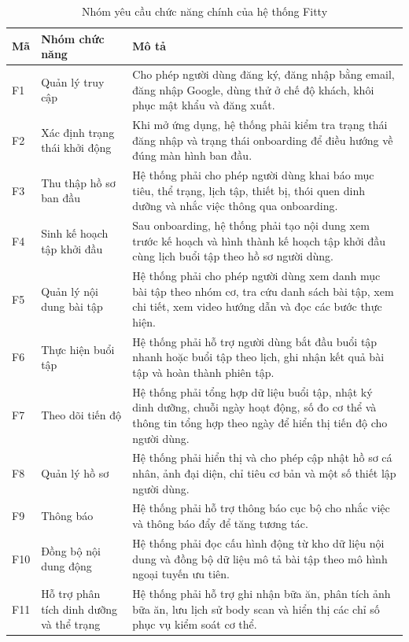 \begin{table}[H]
\centering
\caption{Nhóm yêu cầu chức năng chính của hệ thống Fitty}
\begin{tabular}{|p{1.5cm}|p{4.3cm}|p{7.2cm}|}
\hline
\textbf{Mã} & \textbf{Nhóm chức năng} & \textbf{Mô tả} \\ \hline
F1 & Quản lý truy cập & Cho phép người dùng đăng ký, đăng nhập bằng email, đăng nhập Google, dùng thử ở chế độ khách, khôi phục mật khẩu và đăng xuất. \\ \hline
F2 & Xác định trạng thái khởi động & Khi mở ứng dụng, hệ thống phải kiểm tra trạng thái đăng nhập và trạng thái onboarding để điều hướng về đúng màn hình ban đầu. \\ \hline
F3 & Thu thập hồ sơ ban đầu & Hệ thống phải cho phép người dùng khai báo mục tiêu, thể trạng, lịch tập, thiết bị, thói quen dinh dưỡng và nhắc việc thông qua onboarding. \\ \hline
F4 & Sinh kế hoạch tập khởi đầu & Sau onboarding, hệ thống phải tạo nội dung xem trước kế hoạch và hình thành kế hoạch tập khởi đầu cùng lịch buổi tập theo hồ sơ người dùng. \\ \hline
F5 & Quản lý nội dung bài tập & Hệ thống phải cho phép người dùng xem danh mục bài tập theo nhóm cơ, tra cứu danh sách bài tập, xem chi tiết, xem video hướng dẫn và đọc các bước thực hiện. \\ \hline
F6 & Thực hiện buổi tập & Hệ thống phải hỗ trợ người dùng bắt đầu buổi tập nhanh hoặc buổi tập theo lịch, ghi nhận kết quả bài tập và hoàn thành phiên tập. \\ \hline
F7 & Theo dõi tiến độ & Hệ thống phải tổng hợp dữ liệu buổi tập, nhật ký dinh dưỡng, chuỗi ngày hoạt động, số đo cơ thể và thông tin tổng hợp theo ngày để hiển thị tiến độ cho người dùng. \\ \hline
F8 & Quản lý hồ sơ & Hệ thống phải hiển thị và cho phép cập nhật hồ sơ cá nhân, ảnh đại diện, chỉ tiêu cơ bản và một số thiết lập người dùng. \\ \hline
F9 & Thông báo & Hệ thống phải hỗ trợ thông báo cục bộ cho nhắc việc và thông báo đẩy để tăng tương tác. \\ \hline
F10 & Đồng bộ nội dung động & Hệ thống phải đọc cấu hình động từ kho dữ liệu nội dung và đồng bộ dữ liệu mô tả bài tập theo mô hình ngoại tuyến ưu tiên. \\ \hline
F11 & Hỗ trợ phân tích dinh dưỡng và thể trạng & Hệ thống phải hỗ trợ ghi nhận bữa ăn, phân tích ảnh bữa ăn, lưu lịch sử body scan và hiển thị các chỉ số phục vụ kiểm soát cơ thể. \\ \hline
\end{tabular}
\end{table}

